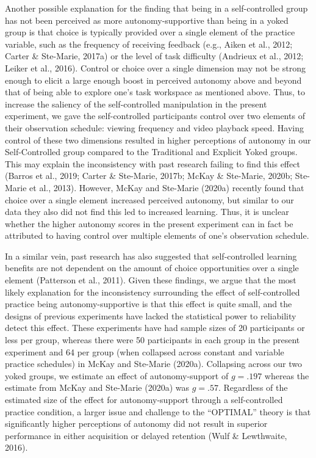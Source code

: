 \documentclass[
  english,
  man,floatsintext]{apa7}
\begin{document}
Another possible explanation for the finding that being in a self-controlled group has not been perceived as more autonomy-supportive than being in a yoked group is that choice is typically provided over a single element of the practice variable, such as the frequency of receiving feedback (e.g., Aiken et al., 2012; Carter \& Ste-Marie, 2017a) or the level of task difficulty (Andrieux et al., 2012; Leiker et al., 2016). Control or choice over a single dimension may not be strong enough to elicit a large enough boost in perceived autonomy above and beyond that of being able to explore one's task workspace as mentioned above. Thus, to increase the saliency of the self-controlled manipulation in the present experiment, we gave the self-controlled participants control over two elements of their observation schedule: viewing frequency and video playback speed. Having control of these two dimensions resulted in higher perceptions of autonomy in our Self-Controlled group compared to the Traditional and Explicit Yoked groups. This may explain the inconsistency with past research failing to find this effect (Barros et al., 2019; Carter \& Ste-Marie, 2017b; McKay \& Ste-Marie, 2020b; Ste-Marie et al., 2013). However, McKay and Ste-Marie (2020a) recently found that choice over a single element increased perceived autonomy, but similar to our data they also did not find this led to increased learning. Thus, it is unclear whether the higher autonomy scores in the present experiment can in fact be attributed to having control over multiple elements of one's observation schedule.

In a similar vein, past research has also suggested that self-controlled learning benefits are not dependent on the amount of choice opportunities over a single element (Patterson et al., 2011). Given these findings, we argue that the most likely explanation for the inconsistency surrounding the effect of self-controlled practice being autonomy-supportive is that this effect is quite small, and the designs of previous experiments have lacked the statistical power to reliability detect this effect. These experiments have had sample sizes of 20 participants or less per group, whereas there were 50 participants in each group in the present experiment and 64 per group (when collapsed across constant and variable practice schedules) in McKay and Ste-Marie (2020a). Collapsing across our two yoked groups, we estimate an effect of autonomy-support of \(g = .197\) whereas the estimate from McKay and Ste-Marie (2020a) was \(g = .57\). Regardless of the estimated size of the effect for autonomy-support through a self-controlled practice condition, a larger issue and challenge to the ``OPTIMAL'' theory is that significantly higher perceptions of autonomy did not result in superior performance in either acquisition or delayed retention (Wulf \& Lewthwaite, 2016).
\end{document}

